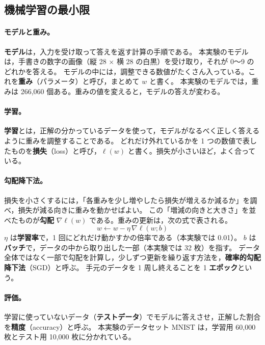 \documentclass[a4j, dvipdfmx]{jsarticle}  %
\begin{document}
\subsection{機械学習の最小限}

\paragraph{モデルと重み。}
\textbf{モデル}は，入力を受け取って答えを返す計算の手順である。
本実験のモデルは，手書きの数字の画像（縦 28 $\times$ 横 28 の白黒）を受け取り，それが 0〜9 のどれかを答える。
モデルの中には，調整できる数値がたくさん入っている。これを\textbf{重み}（パラメータ）と呼び，まとめて $w$ と書く。
本実験のモデルでは，重みは 266{,}060 個ある。重みの値を変えると，モデルの答えが変わる。

\paragraph{学習。}
\textbf{学習}とは，正解の分かっているデータを使って，モデルがなるべく正しく答えるように重みを調整することである。
どれだけ外れているかを 1 つの数値で表したものを\textbf{損失}（loss）と呼び，$\ell(w)$ と書く。損失が小さいほど，よく合っている。

\paragraph{勾配降下法。}
損失を小さくするには，「各重みを少し増やしたら損失が増えるか減るか」を調べ，損失が減る向きに重みを動かせばよい。
この「増減の向きと大きさ」を並べたものが\textbf{勾配} $\nabla \ell(w)$ である。重みの更新は，次の式で表される。
\begin{equation}
  w \leftarrow w - \eta\, \nabla \ell(w; b)
  \label{eq:sgd}
\end{equation}
$\eta$ は\textbf{学習率}で，1 回にどれだけ動かすかの倍率である（本実験では 0.01）。
$b$ は\textbf{バッチ}で，データの中から取り出した一部（本実験では 32 枚）を指す。
データ全体ではなく一部で勾配を計算し，少しずつ更新を繰り返す方法を，\textbf{確率的勾配降下法}（SGD）と呼ぶ。
手元のデータを 1 周し終えることを 1 \textbf{エポック}という。

\paragraph{評価。}
学習に使っていないデータ（\textbf{テストデータ}）でモデルに答えさせ，正解した割合を\textbf{精度}（accuracy）と呼ぶ。
本実験のデータセット MNIST は，学習用 60{,}000 枚とテスト用 10{,}000 枚に分かれている。
\end{document}
